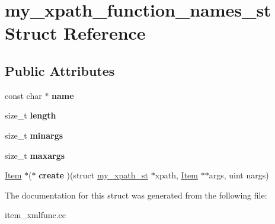 \hypertarget{structmy__xpath__function__names__st}{}\section{my\+\_\+xpath\+\_\+function\+\_\+names\+\_\+st Struct Reference}
\label{structmy__xpath__function__names__st}
\subsection*{Public Attributes}
\begin{DoxyCompactItemize}
\item 
\mbox{\label{structmy__xpath__function__names__st_a2940f480fc8aab3d7c1a0f8d1122ecb3}} 
const char $\ast$ {\bfseries name}
\item 
\mbox{\label{structmy__xpath__function__names__st_a625d5dbf7d315982bde45e71352d41c8}} 
size\+\_\+t {\bfseries length}
\item 
\mbox{\label{structmy__xpath__function__names__st_a1fb5ecc62e08e7d151e9c4edc10b9e9f}} 
size\+\_\+t {\bfseries minargs}
\item 
\mbox{\label{structmy__xpath__function__names__st_acc26896f15a87a1a9888804ab5eec0dd}} 
size\+\_\+t {\bfseries maxargs}
\item 
\mbox{\label{structmy__xpath__function__names__st_a20e12cd9bb9cd803bc4acb735f03a0c5}} 
\mbox{\hyperlink{classItem}{Item}} $\ast$($\ast$ {\bfseries create} )(struct \mbox{\hyperlink{structmy__xpath__st}{my\+\_\+xpath\+\_\+st}} $\ast$xpath, \mbox{\hyperlink{classItem}{Item}} $\ast$$\ast$args, uint nargs)
\end{DoxyCompactItemize}


The documentation for this struct was generated from the following file\+:\begin{DoxyCompactItemize}
\item 
item\+\_\+xmlfunc.\+cc\end{DoxyCompactItemize}
